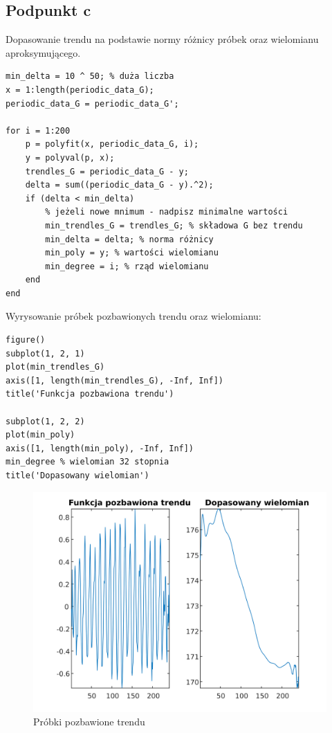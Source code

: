 \documentclass[a4paper, 12pt, titlepage]{article}
\begin{document}
        \subsection{Podpunkt c}
            Dopasowanie trendu na podstawie normy różnicy próbek oraz
            wielomianu aproksymującego.
\begin{lstlisting}
min_delta = 10 ^ 50; % duża liczba
x = 1:length(periodic_data_G);
periodic_data_G = periodic_data_G';

for i = 1:200
    p = polyfit(x, periodic_data_G, i);
    y = polyval(p, x);
    trendles_G = periodic_data_G - y;
    delta = sum((periodic_data_G - y).^2);
    if (delta < min_delta) 
        % jeżeli nowe mnimum - nadpisz minimalne wartości
        min_trendles_G = trendles_G; % składowa G bez trendu
        min_delta = delta; % norma różnicy
        min_poly = y; % wartości wielomianu
        min_degree = i; % rząd wielomianu
    end
end
\end{lstlisting}
            Wyrysowanie próbek pozbawionych trendu oraz wielomianu:
\begin{lstlisting}
figure()
subplot(1, 2, 1)
plot(min_trendles_G)
axis([1, length(min_trendles_G), -Inf, Inf])
title('Funkcja pozbawiona trendu')

subplot(1, 2, 2)
plot(min_poly)
axis([1, length(min_poly), -Inf, Inf])
min_degree % wielomian 32 stopnia
title('Dopasowany wielomian')
\end{lstlisting}
            \begin{figure}[H]
                \centering
                \includegraphics[width=0.8\columnwidth]{polyfit.png}
                \caption{Próbki pozbawione trendu}
            \end{figure}\noindent
\end{document}
